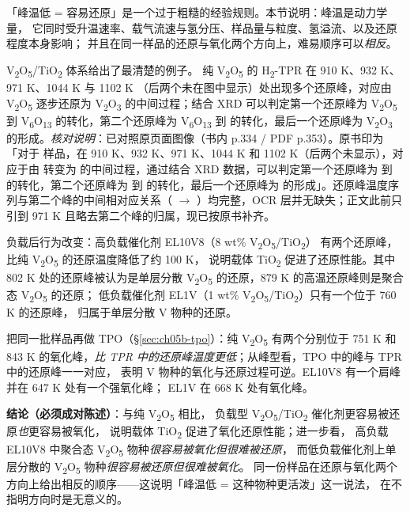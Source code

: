 \begin{probout}
「峰温低 = 容易还原」是一个过于粗糙的经验规则。本节说明：峰温是动力学量，
它同时受升温速率、载气流速与氢分压、样品量与粒度、氢溢流、以及还原程度本身影响；
并且在同一样品的还原与氧化两个方向上，难易顺序可以\emph{相反}。
\end{probout}

\begin{dataflow}
V\textsubscript{2}O\textsubscript{5}/TiO\textsubscript{2} 体系给出了最清楚的例子。
纯 V\textsubscript{2}O\textsubscript{5} 的 H\textsubscript{2}-TPR 在 910 K、932 K、971 K、1044 K 与 1102 K
（后两个未在图中显示）处出现多个还原峰，对应由 V\textsubscript{2}O\textsubscript{5} 逐步还原为
V\textsubscript{2}O\textsubscript{3} 的中间过程；结合 XRD 可以判定第一个还原峰为
V\textsubscript{2}O\textsubscript{5} 到 V\textsubscript{6}O\textsubscript{13} 的转化，第二个还原峰为
V\textsubscript{6}O\textsubscript{13} 到  的转化，最后一个还原峰为 V\textsubscript{2}O\textsubscript{3} 的形成。\emph{核对说明}：已对照原页面图像（书内 p.334 / PDF p.353）。原书印为「对于  样品，在 910 K、932 K、971 K、1044 K 和 1102 K（后两个未显示），对应于由  转变为  的中间过程，通过结合 XRD 数据，可以判定第一个还原峰为  到  的转化，第二个还原峰为  到  的转化，最后一个还原峰为  的形成」。还原峰温度序列与第二个峰的中间相对应关系（ $\rightarrow$ ）均完整，OCR 层并无缺失；正文此前只引到 971 K 且略去第二个峰的归属，现已按原书补齐。

负载后行为改变：高负载催化剂 EL10V8（8 wt\% V\textsubscript{2}O\textsubscript{5}/TiO\textsubscript{2}）
有两个还原峰，比纯 V\textsubscript{2}O\textsubscript{5} 的还原温度降低了约 100 K，
说明载体 TiO\textsubscript{2} 促进了还原性能。其中 802 K 处的还原峰被认为是单层分散
V\textsubscript{2}O\textsubscript{5} 的还原，879 K 的高温还原峰则是聚合态 V\textsubscript{2}O\textsubscript{5} 的还原；
低负载催化剂 EL1V（1 wt\% V\textsubscript{2}O\textsubscript{5}/TiO\textsubscript{2}）只有一个位于 760 K 的还原峰，
归属于单层分散 V 物种的还原。

把同一批样品再做 TPO（\S\ref{sec:ch05b-tpo}）：纯 V\textsubscript{2}O\textsubscript{5} 有两个分别位于 751 K
和 843 K 的氧化峰，\emph{比 TPR 中的还原峰温度更低}；从峰型看，TPO 中的峰与 TPR 中的还原峰一一对应，
表明 V 物种的氧化与还原过程可逆。EL10V8 有一个肩峰并在 647 K 处有一个强氧化峰；
EL1V 在 668 K 处有氧化峰。

\textbf{结论（必须成对陈述）}：与纯 V\textsubscript{2}O\textsubscript{5} 相比，
负载型 V\textsubscript{2}O\textsubscript{5}/TiO\textsubscript{2} 催化剂更容易被还原\emph{也}更容易被氧化，
说明载体 TiO\textsubscript{2} 促进了氧化还原性能；进一步看，
高负载 EL10V8 中聚合态 V\textsubscript{2}O\textsubscript{5} 物种\emph{很容易被氧化但很难被还原}，
而低负载催化剂上单层分散的 V\textsubscript{2}O\textsubscript{5} 物种\emph{很容易被还原但很难被氧化}。
同一份样品在还原与氧化两个方向上给出相反的顺序——这说明「峰温低 = 这种物种更活泼」这一说法，
在不指明方向时是无意义的。
\end{dataflow}

